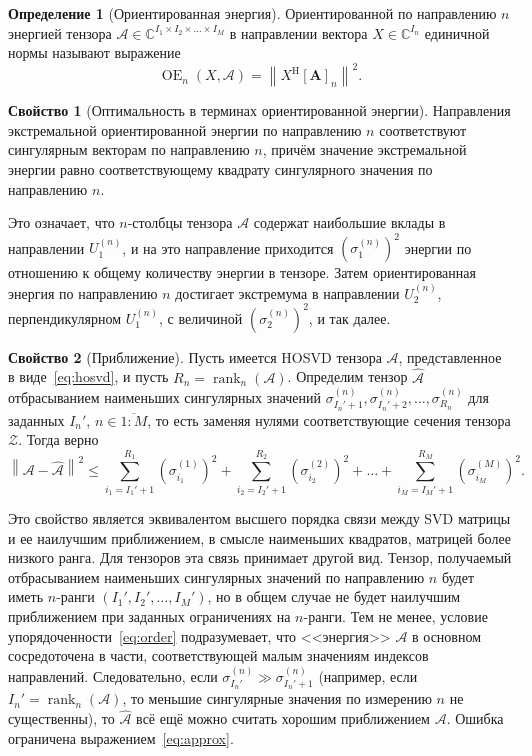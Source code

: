 \documentclass[specialist,
  substylefile=spbu_report.rtx,
subf,href,colorlinks=true, 12pt]{disser}
\theoremstyle{plain}
\theoremstyle{definition}
\newtheorem{definition}{Определение}[section]
\newtheorem{property}{Свойство}[section]
\theoremstyle{remark}
\begin{document}
\begin{definition}[Ориентированная энергия]
  Ориентированной по направлению $n$ энергией тензора $\mathcal{A}\in
  \mathbb{C}^{I_1\times I_2\times \ldots \times I_M}$ в направлении
  вектора $X\in \mathbb{C}^{I_n}$ единичной нормы называют выражение
  \[
    \operatorname{OE}_n(X, \mathcal{A}) =
    \left\|X^{\mathrm{H}}[\mathbf{A}]_{n}\right\|^2.
  \]
\end{definition}
\begin{property}[Оптимальность в терминах ориентированной энергии]
  \label{property:oriented-energy}
  Направления экстремальной ориентированной энергии по направлению
  $n$ соответствуют сингулярным векторам по направлению $n$,
  причём значение экстремальной энергии равно соответствующему
  квадрату сингулярного значения по направлению $n$.
\end{property}
Это означает, что $n$-столбцы тензора $\mathcal{A}$ содержат
наибольшие вклады в
направлении $U^{(n)}_1$, и
на это направление приходится $\left(\sigma^{(n)}_1\right)^2$ энергии
по отношению к общему количеству энергии в тензоре.
Затем ориентированная энергия по направлению $n$ достигает экстремума
в направлении $U^{(n)}_2$,
перпендикулярном $U^{(n)}_1$, с величиной
$\left(\sigma^{(n)}_2\right)^2$, и так далее.

\begin{property}[Приближение]
  \label{property:approx}
  Пусть имеется HOSVD тензора $\mathcal{A}$, представленное в
  виде~\eqref{eq:hosvd}, и пусть $R_n=\operatorname{rank}_n(\mathcal{A})$.
  Определим тензор $\widehat{\mathcal{A}}$ отбрасыванием наименьших
  сингулярных значений $\sigma_{I_{n}'+1}^{(n)},
  \sigma_{I_{n}'+2}^{(n)},\ldots, \sigma_{R_n}^{(n)}$
  для заданных $I_{n}'$, $n \in \overline{1:M}$, то есть заменяя
  нулями соответствующие сечения тензора $\mathcal{Z}$.
  Тогда верно
  \begin{equation}
    \left\|\mathcal{A}-\widehat{\mathcal{A}}\right\|^2\leqslant
    \sum_{i_1=I_{1}'+1}^{R_1}\left( \sigma_{i_1}^{(1)}\right)^2 +
    \sum_{i_2=I_{2}'+1}^{R_2}\left( \sigma_{i_2}^{(2)}\right)^2 +
    \ldots + \sum_{i_M=I_{M}'+1}^{R_M}\left(
    \sigma_{i_M}^{(M)}\right)^2.\label{eq:approx}
  \end{equation}
\end{property}

Это свойство является эквивалентом высшего порядка связи между SVD
матрицы и ее наилучшим приближением,
в смысле наименьших квадратов, матрицей более низкого ранга.
Для тензоров эта связь принимает другой вид.
Тензор, получаемый отбрасыванием наименьших сингулярных значений по
направлению $n$ будет иметь
$n$-ранги $(I_1', I_2', \ldots, I_M')$, но в общем случае не будет
наилучшим приближением при
заданных ограничениях на $n$-ранги.
Тем не менее, условие упорядоченности~\eqref{eq:order} подразумевает,
что <<энергия>> $\mathcal{A}$ в основном сосредоточена в части,
соответствующей малым значениям индексов направлений.
Следовательно, если $\sigma^{(n)}_{I_n'} \gg \sigma^{(n)}_{I_n'+1}$
(например, если $I_n'=\operatorname{rank}_n(\mathcal{A})$,
то меньшие сингулярные значения по измерению $n$ не существенны), то
$\widehat{\mathcal{A}}$ всё ещё можно считать хорошим приближением
$\mathcal{A}$.
Ошибка ограничена выражением~\eqref{eq:approx}.
\end{document}
